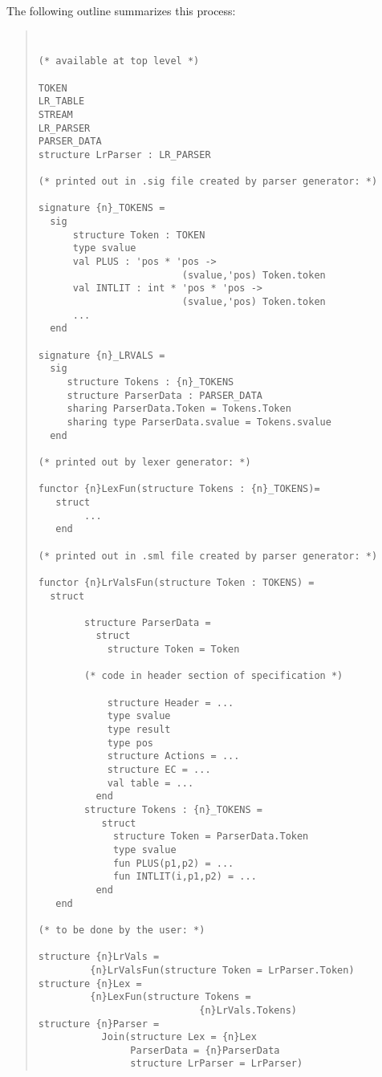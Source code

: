 The following outline summarizes this process:
\begin{quote}
\tt
\begin{verbatim}
(* available at top level *)

TOKEN
LR_TABLE
STREAM
LR_PARSER
PARSER_DATA
structure LrParser : LR_PARSER

(* printed out in .sig file created by parser generator: *)

signature {n}_TOKENS = 
  sig
      structure Token : TOKEN
      type svalue
      val PLUS : 'pos * 'pos ->
                         (svalue,'pos) Token.token
      val INTLIT : int * 'pos * 'pos ->
                         (svalue,'pos) Token.token
      ...
  end

signature {n}_LRVALS =
  sig
     structure Tokens : {n}_TOKENS
     structure ParserData : PARSER_DATA
     sharing ParserData.Token = Tokens.Token
     sharing type ParserData.svalue = Tokens.svalue
  end

(* printed out by lexer generator: *)

functor {n}LexFun(structure Tokens : {n}_TOKENS)=
   struct
        ...
   end

(* printed out in .sml file created by parser generator: *)

functor {n}LrValsFun(structure Token : TOKENS) =
  struct

        structure ParserData =
          struct
            structure Token = Token

        (* code in header section of specification *)

            structure Header = ...
            type svalue
            type result
            type pos
            structure Actions = ...
            structure EC = ...
            val table = ...
          end
        structure Tokens : {n}_TOKENS =
           struct
             structure Token = ParserData.Token
             type svalue
             fun PLUS(p1,p2) = ...
             fun INTLIT(i,p1,p2) = ... 
          end
   end

(* to be done by the user: *)
 
structure {n}LrVals =
         {n}LrValsFun(structure Token = LrParser.Token)
structure {n}Lex = 
         {n}LexFun(structure Tokens =
                            {n}LrVals.Tokens)
structure {n}Parser =
           Join(structure Lex = {n}Lex
                ParserData = {n}ParserData
                structure LrParser = LrParser)
\end{verbatim}
\end{quote}

